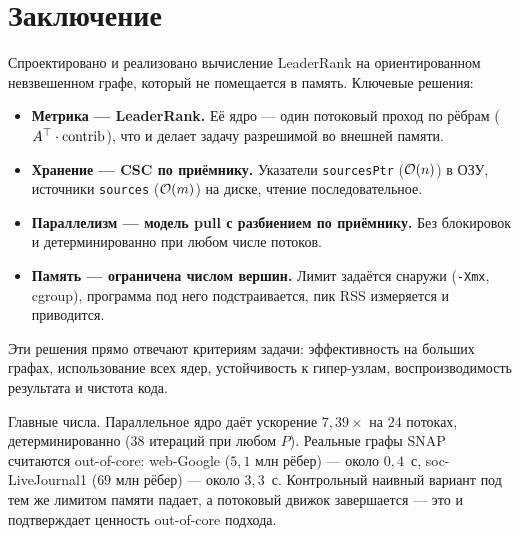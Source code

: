 \section{Заключение}
\label{sec:conclusion}

Спроектировано и реализовано вычисление LeaderRank на ориентированном невзвешенном графе, который не
помещается в память. Ключевые решения:
\begin{itemize}[itemsep=2pt]
  \item \textbf{Метрика --- LeaderRank.} Её ядро --- один потоковый проход по рёбрам
        ($A^{\top}\cdot\mathrm{contrib}$), что и делает задачу разрешимой во внешней памяти.
  \item \textbf{Хранение --- CSC по приёмнику.} Указатели \texttt{sourcesPtr} ($\mathcal{O}(n)$) в ОЗУ,
        источники \texttt{sources} ($\mathcal{O}(m)$) на диске, чтение последовательное.
  \item \textbf{Параллелизм --- модель pull с разбиением по приёмнику.} Без блокировок и
        детерминированно при любом числе потоков.
  \item \textbf{Память --- ограничена числом вершин.} Лимит задаётся снаружи (\texttt{-Xmx}, cgroup),
        программа под него подстраивается, пик RSS измеряется и приводится.
\end{itemize}

Эти решения прямо отвечают критериям задачи: эффективность на больших графах, использование всех
ядер, устойчивость к гипер-узлам, воспроизводимость результата и чистота кода.

Главные числа. Параллельное ядро даёт ускорение $7{,}39\times$ на $24$ потоках, детерминированно
($38$ итераций при любом $P$). Реальные графы SNAP считаются out-of-core: web-Google ($5{,}1$ млн
рёбер) --- около $0{,}4$~с, soc-LiveJournal1 ($69$ млн рёбер) --- около $3{,}3$~с. Контрольный наивный
вариант под тем же лимитом памяти падает, а потоковый движок завершается --- это и подтверждает
ценность out-of-core подхода.
